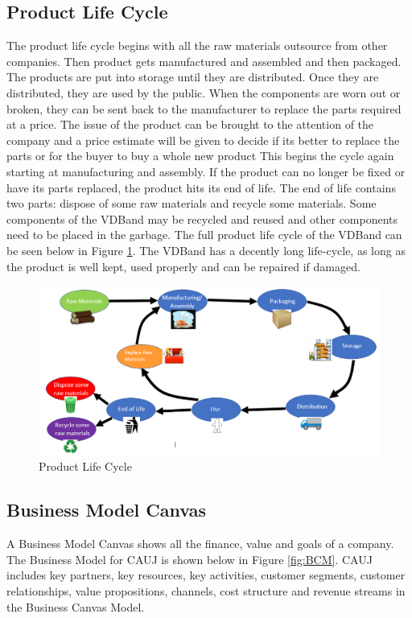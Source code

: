 \documentclass[11.5pt]{article}
\begin{document}
\subsection{Product Life Cycle}
The product life cycle begins with all the raw materials outsource from other companies. Then product gets manufactured and assembled and then packaged. The products are put into storage until they are distributed. Once they are distributed, they are used by the public. When the components are worn out or broken, they can be sent back to the manufacturer to replace the parts required at a price. The issue of the product can be brought to the attention of the company and a price estimate will be given to decide if its better to replace the parts or for the buyer to buy a whole new product This begins the cycle again starting at manufacturing and assembly. If the product can no longer be fixed or have its parts replaced, the product hits its end of life. The end of life contains two parts: dispose of some raw materials and recycle some materials. Some components of the VDBand may be recycled and reused and other components need to be placed in the garbage. The full product life cycle of the VDBand can be seen below in Figure \ref{fig:PLC}. The VDBand has a decently long life-cycle, as long as the product is well kept, used properly and can be repaired if damaged.

\begin{figure}[H]
    \centering
    \includegraphics[width=1.05\linewidth]{marketing/PLC.PNG}
    \caption{Product Life Cycle}
    \label{fig:PLC}
\end{figure}

\subsection{Business Model Canvas}
A Business Model Canvas shows all the finance, value and goals of a company. The Business Model for CAUJ is shown below in Figure \ref{fig:BCM}. CAUJ includes key partners, key resources, key activities, customer segments, customer relationships, value propositions, channels, cost structure and revenue streams in the Business Canvas Model.
\end{document}

